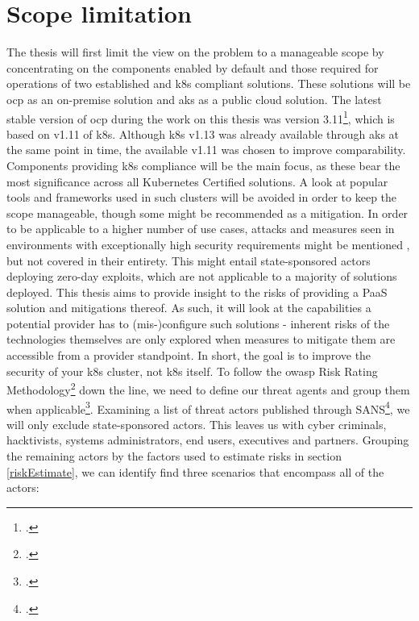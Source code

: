 \section{Scope limitation} \label{scopeLimit}

The thesis will first limit the view on the problem to a manageable scope by concentrating on the components enabled by default and those required for operations of two established and \gls{k8s} compliant solutions.
These solutions will be \gls{ocp} as an on-premise solution and \gls{aks} as a public cloud solution. 
The latest stable version of \gls{ocp} during the work on this thesis was version 3.11\footcite{ocpRelease}, which is based on v1.11 of \gls{k8s}.
Although \gls{k8s} v1.13 was already available through \gls{aks} at the same point in time, the available v1.11 was chosen to improve comparability.
Components providing \gls{k8s} compliance will be the main focus, as these bear the most significance across all Kubernetes Certified solutions. 
A look at popular tools and frameworks used in such clusters will be avoided in order to keep the scope manageable, though some might be recommended as a mitigation.
In order to be applicable to a higher number of use cases, attacks and measures seen in environments with exceptionally high security requirements might be mentioned , but not  covered in their entirety. This might entail state-sponsored actors deploying zero-day exploits, which are not applicable to a majority of solutions deployed.
This thesis aims to provide insight to the risks of providing a PaaS solution and mitigations thereof. 
As such, it will look at the capabilities a potential provider has to (mis-)configure such solutions - inherent risks of the technologies themselves are only explored when measures to mitigate them are accessible from a provider standpoint. 
In short, the goal is to improve the security of your \gls{k8s} cluster, not \gls{k8s} itself.
To follow the \gls{owasp} Risk Rating Methodology\footcite{riskRating} down the line, we need to define our threat agents and group them when applicable\footcite{threatModeling}. Examining a list of threat actors published through SANS\footcite{sansThreatActors}, we will only exclude state-sponsored actors. This leaves us with cyber criminals, hacktivists, systems administrators, end users, executives and partners.
Grouping the remaining actors by the factors used to estimate risks in section \ref{riskEstimate}, we can identify find three scenarios that encompass all of the actors:
